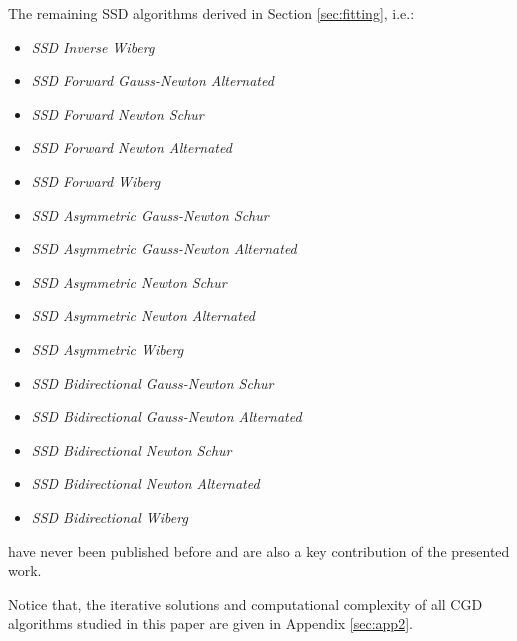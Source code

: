 The remaining SSD algorithms derived in Section \ref{sec:fitting}, i.e.:
\begin{itemize}
\item \emph{SSD Inverse Wiberg}
\item \emph{SSD Forward Gauss-Newton Alternated}
\item \emph{SSD Forward Newton Schur}
\item \emph{SSD Forward Newton Alternated}
\item \emph{SSD Forward Wiberg}
\item \emph{SSD Asymmetric Gauss-Newton Schur}
\item \emph{SSD Asymmetric Gauss-Newton Alternated}
\item \emph{SSD Asymmetric Newton Schur}
\item \emph{SSD Asymmetric Newton Alternated}
\item \emph{SSD Asymmetric Wiberg}
\item \emph{SSD Bidirectional Gauss-Newton Schur}
\item \emph{SSD Bidirectional Gauss-Newton Alternated}
\item \emph{SSD Bidirectional Newton Schur}
\item \emph{SSD Bidirectional Newton Alternated}
\item \emph{SSD Bidirectional Wiberg}
\end{itemize}
have never been published before and are also a key contribution of the presented work.

Notice that, the iterative solutions and computational complexity of all CGD algorithms studied in this paper are given in Appendix \ref{sec:app2}.